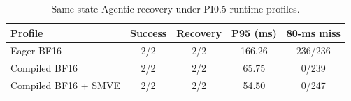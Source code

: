 \begin{table}
\caption{Same-state Agentic recovery under PI0.5 runtime profiles.}
\label{tab:agentic_optimize}
\centering\small
\begin{tabular}{lcccc}
\toprule
Profile & Success & Recovery & P95 (ms) & 80-ms miss \\
\midrule
Eager BF16 & 2/2 & 2/2 & 166.26 & 236/236 \\
Compiled BF16 & 2/2 & 2/2 & 65.75 & 0/239 \\
Compiled BF16 + SMVE & 2/2 & 2/2 & 54.50 & 0/247 \\
\bottomrule
\end{tabular}
\end{table}
